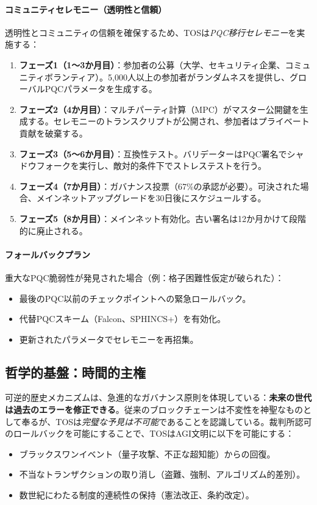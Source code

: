 \documentclass[11pt]{article}
\begin{document}
\paragraph{コミュニティセレモニー（透明性と信頼）}
透明性とコミュニティの信頼を確保するため、TOSは\emph{PQC移行セレモニー}を実施する：
\begin{enumerate}[noitemsep]
  \item \textbf{フェーズ1（1〜3か月目）}：参加者の公募（大学、セキュリティ企業、コミュニティボランティア）。5,000人以上の参加者がランダムネスを提供し、グローバルPQCパラメータを生成する。
  \item \textbf{フェーズ2（4か月目）}：マルチパーティ計算（MPC）がマスター公開鍵を生成する。セレモニーのトランスクリプトが公開され、参加者はプライベート貢献を破棄する。
  \item \textbf{フェーズ3（5〜6か月目）}：互換性テスト。バリデーターはPQC署名でシャドウフォークを実行し、敵対的条件下でストレステストを行う。
  \item \textbf{フェーズ4（7か月目）}：ガバナンス投票（67\%の承認が必要）。可決された場合、メインネットアップグレードを30日後にスケジュールする。
  \item \textbf{フェーズ5（8か月目）}：メインネット有効化。古い署名は12か月かけて段階的に廃止される。
\end{enumerate}

\paragraph{フォールバックプラン}
重大なPQC脆弱性が発見された場合（例：格子困難性仮定が破られた）：
\begin{itemize}[noitemsep]
  \item 最後のPQC以前のチェックポイントへの緊急ロールバック。
  \item 代替PQCスキーム（Falcon、SPHINCS+）を有効化。
  \item 更新されたパラメータでセレモニーを再招集。
\end{itemize}

\subsection{哲学的基盤：時間的主権}

可逆的歴史メカニズムは、急進的なガバナンス原則を体現している：\textbf{未来の世代は過去のエラーを修正できる}。従来のブロックチェーンは不変性を神聖なものとして奉るが、TOSは\emph{完璧な予見は不可能}であることを認識している。裁判所認可のロールバックを可能にすることで、TOSはAGI文明に以下を可能にする：
\begin{itemize}[noitemsep]
  \item ブラックスワンイベント（量子攻撃、不正な超知能）からの回復。
  \item 不当なトランザクションの取り消し（盗難、強制、アルゴリズム的差別）。
  \item 数世紀にわたる制度的連続性の保持（憲法改正、条約改定）。
\end{itemize}
\end{document}
